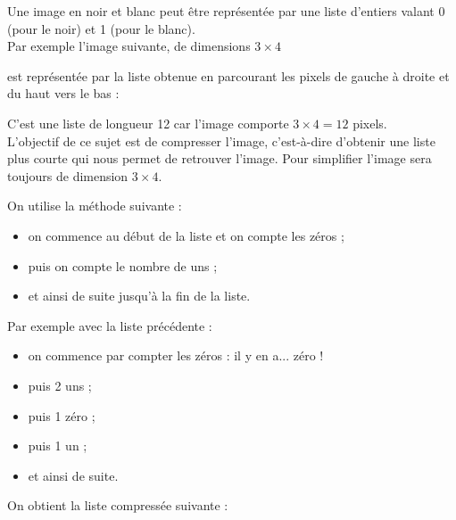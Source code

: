 

\maketitle

Une image en noir et blanc peut être représentée par une liste d'entiers valant 0 (pour le noir) et 1 (pour le blanc).\\
Par exemple l'image suivante, de dimensions $3\times 4$ 
\begin{center}
\end{center}

est représentée par la liste obtenue en parcourant les pixels de gauche à droite et du haut vers le bas :


C'est une liste de longueur 12 car l'image comporte $3\times 4 = 12$ pixels.\\


L'objectif de ce sujet est de compresser l'image, c'est-à-dire d'obtenir une liste plus courte qui nous permet de retrouver l'image. Pour simplifier l'image sera toujours de dimension $3\times 4$.

On utilise la méthode suivante :
\begin{itemize}
	\item on commence au début de la liste et on compte les zéros ;
    \item puis on compte le nombre de uns ;
    \item et ainsi de suite jusqu'à la fin de la liste.
\end{itemize}
Par exemple avec la liste précédente :
\begin{itemize}
	\item on commence par compter les zéros : il y en a... zéro !
    \item puis 2 uns ;
    \item puis 1 zéro ;
    \item puis 1 un ;
    \item et ainsi de suite.
\end{itemize}
On obtient la liste compressée suivante :

